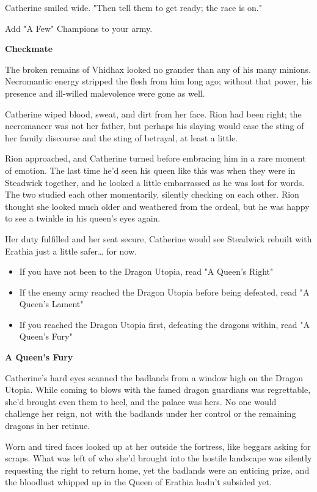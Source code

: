\begin{multicols*}{2}
Catherine smiled wide. "Then tell them to get ready; the race is on."

\textcolor{darkcandyapplered}{Add "A Few" Champions to your army.}

\textbf{Checkmate}

The broken remains of Vhidhax looked no grander than any of his many minions. Necromantic energy stripped the flesh from him long ago; without that power, his presence and ill-willed malevolence were gone as well.

Catherine wiped blood, sweat, and dirt from her face. Rion had been right; the necromancer was not her father, but perhaps his slaying would ease the sting of her family discourse and the sting of betrayal, at least a little. 

Rion approached, and Catherine turned before embracing him in a rare moment of emotion. The last time he'd seen his queen like this was when they were in Steadwick together, and he looked a little embarrassed as he was lost for words. The two studied each other momentarily, silently checking on each other. Rion thought she looked much older and weathered from the ordeal, but he was happy to see a twinkle in his queen's eyes again.

Her duty fulfilled and her seat secure, Catherine would see Steadwick rebuilt with Erathia just a little safer… for now.

\begin{itemize}
    \item \textcolor{darkcandyapplered}{If you have not been to the Dragon Utopia, read "A Queen's Right"}
    \item \textcolor{darkcandyapplered}{If the enemy army reached the Dragon Utopia before being defeated, read "A Queen's Lament"}
    \item \textcolor{darkcandyapplered}{If you reached the Dragon Utopia first, defeating the dragons within, read "A Queen's Fury"}
\end{itemize}

\textbf{A Queen's Fury}

Catherine's hard eyes scanned the badlands from a window high on the Dragon Utopia. While coming to blows with the famed dragon guardians was regrettable, she'd brought even them to heel, and the palace was hers. No one would challenge her reign, not with the badlands under her control or the remaining dragons in her retinue.

Worn and tired faces looked up at her outside the fortress, like beggars asking for scraps. What was left of who she'd brought into the hostile landscape was silently requesting the right to return home, yet the badlands were an enticing prize, and the bloodlust whipped up in the Queen of Erathia hadn't subsided yet.


\end{multicols*}
